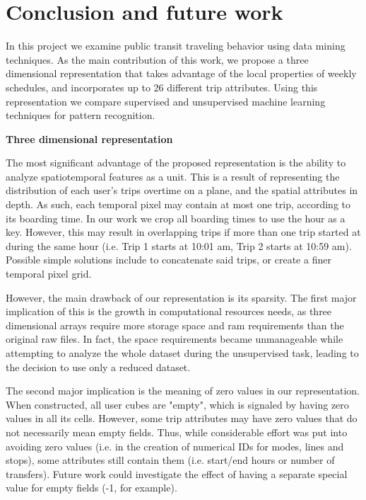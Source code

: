 \documentclass{article}
\begin{document}
\newpage
\section{Conclusion and future work}
\label{sec:conclusion}
In this project we examine public transit traveling behavior using data mining techniques. As the main contribution of this work, we propose a three dimensional representation that takes advantage of the local properties of weekly schedules, and incorporates up to 26 different trip attributes. Using this representation we compare supervised and unsupervised machine learning techniques for pattern recognition. 

\textbf{Three dimensional representation}

The most significant advantage of the proposed representation is the ability to analyze spatiotemporal features as a unit. This is a result of representing the distribution of each user's trips overtime on a plane, and the spatial attributes in depth. As such, each temporal pixel may contain at most one trip, according to its boarding time. In our work we crop all boarding times to use the hour as a key. However, this may result in overlapping trips if more than one trip started at during the same hour (i.e. Trip 1 starts at 10:01 am, Trip 2 starts at 10:59 am). Possible simple solutions include to concatenate said trips, or create a finer temporal pixel grid. 

However, the main drawback of our representation is its sparsity. The first major implication of this is the growth in computational resources needs, as three dimensional arrays require more storage space and ram requirements than the original raw files. In fact, the space requirements became unmanageable while attempting to analyze the whole dataset during the unsupervised task, leading to the decision to use only a reduced dataset.

The second major implication is the meaning of zero values in our representation. When constructed, all user cubes are "empty", which is signaled by having zero values in all its cells. However, some trip attributes  may have zero values that do not necessarily mean empty fields. Thus, while considerable effort was put into avoiding zero values (i.e. in the creation of numerical IDs for modes, lines and stops), some attributes still contain them (i.e. start/end hours or number of transfers). Future work could investigate the effect of having a separate special value for empty fields (-1, for example).
\end{document}

